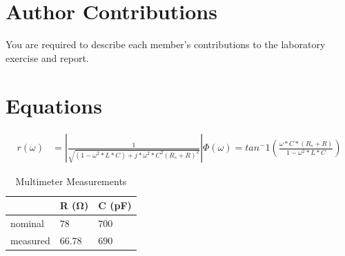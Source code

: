 \documentclass[10pt,twocolumn]{article}
\begin{document}
\section{Author Contributions}

You are required to describe each member's contributions to the laboratory exercise and report.

\section{Equations}


\begin{align*}
	
	 r(\omega) &= |\frac{1}{\sqrt{\left(1 - \omega^2*L*C\right) + j*\omega^2*C^2\left(R_{s}+R\right)^2}}|
	 
	 \Phi(\omega) = tan^-1(\frac{\omega*C*\left(R_{s}+R\right)}{1-\omega^2*L*C})
\end{align*}

\begin{table}[bt]
	\begin{tabularx}{1\linewidth}{ lXX }
		\hline
		 & \textbf{R (Ω)} & \textbf{C (pF)} \\
		\hline
		nominal & $78$ & $700$ \\
		measured & $66.78$ & $690$ \\
		\hline
	\end{tabularx}
	\caption{Multimeter Measurements}
	\label{tab:Tab1}
\end{table}
\end{document}

